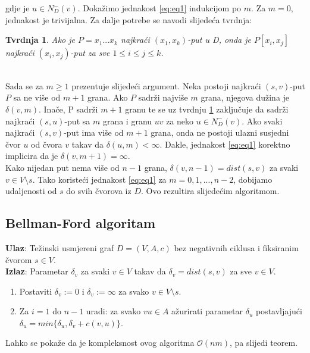 \documentclass[conference]{IEEEtran}
\newtheorem{remark}{Tvrdnja}[section]
\begin{document}
\noindent gdje je $u \in N_D^-(v)$. Dokažimo jednakost \ref{eq:eq1} indukcijom po $m$. Za $m =0$, jednakost je trivijalna. Za dalje potrebe se navodi slijedeća tvrdnja\cite{bang2008digraphs}: \\

\begin{remark}\label{remark:r1}
Ako je $P = x_1...x_k$ najkraći $(x_1, x_k)$-put u D, onda je $P[x_i,x_j]$ najkraći $(x_i, x_j)$-put za sve $1 \leq i \leq j \leq k$.
\end{remark}

\noindent \\Sada se za $m  \geq 1$ prezentuje slijedeći argument. Neka postoji najkraći $(s,v)$-put $P$ sa ne više od $m+1$ grana. Ako $P$ sadrži najviše $m$ grana, njegova dužina je $\delta(v,m)$. Inače, P sadrži $m+1$ granu te se uz tvrdnju \ref{remark:r1} zaključuje da sadrži najkraći $(s,u)$-put sa $m$ grana i granu $uv$ za neko $u \in N_D^-(v)$. Ako svaki najkraći $(s,v)$-put ima više od $m+1$ grana, onda ne postoji ulazni susjedni čvor $u$ od čvora $v$ takav da $\delta(u,m) < \infty$. Dakle, jednakost \ref{eq:eq1} korektno implicira  da je $\delta(v, m+1) = \infty$. \\
\indent Kako nijedan put nema više od $n-1$ grana, $\delta(v, n-1)= dist(s,v)$ za svaki $v \in V \setminus s$. Tako koristeći jednakost \ref{eq:eq1} za $m = 0,1,...,n-2$, dobijamo udaljenosti od $s$ do svih čvorova iz $D$. Ovo rezultira slijedećim algoritmom\cite{bang2008digraphs}.  

\subsection{Bellman-Ford algoritam}
\textbf{Ulaz}: Težinski usmjereni graf $D=(V,A,c)$ bez negativnih ciklusa i fiksiranim čvorom $s\in V$. \\
\textbf{Izlaz}: Parametar $\delta_v$ za svaki $v \in V$ takav da $\delta_v = dist(s,v)$ za sve $v \in V$. 
\begin{enumerate}
    \item Postaviti $\delta_v := 0 $ i $\delta_v := \infty $ za svako  $v \in V \setminus s$.
    \item Za $i=1$ do $n-1$ uradi: za svako $vu \in A$ ažurirati parametar $\delta_u$ postavljajući $\delta_u = min\{\delta_u, \delta_v + c(v,u)\}$.
\end{enumerate}
\noindent Lahko se pokaže da je kompleksnost ovog algoritma $\mathcal{O}(nm)$, pa slijedi teorem\cite{bang2008digraphs}.
\end{document}

